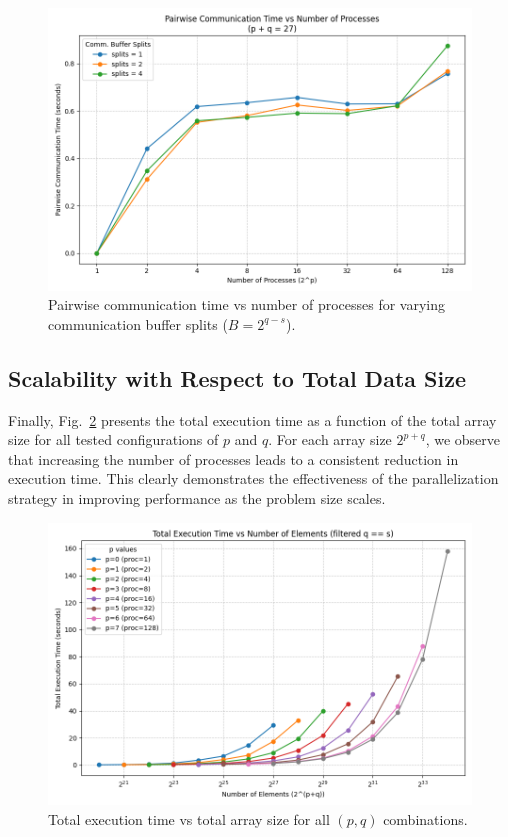 \documentclass{article}
\begin{document}
\begin{figure}
    \centering
    \includegraphics[width=1\linewidth]{figures/pairwise_comm_vs_procs_splits_sum.png}
    \caption{Pairwise communication time vs number of processes for varying communication buffer splits 
    ($B = 2^{q-s}$).}
    \label{fig:pairwise_comm_vs_procs_splits_sum}
\end{figure}

\subsection{Scalability with Respect to Total Data Size}

Finally, Fig.~\ref{fig:total_time_vs_elements} presents the total execution time as a function of the 
total array size for all tested configurations of $p$ and $q$. For each array size $2^{p+q}$, we observe
that increasing the number of processes leads to a consistent reduction in execution time. This clearly 
demonstrates the effectiveness of the parallelization strategy in improving performance as the problem 
size scales.

\begin{figure}[h]
    \centering
    \includegraphics[width=1\linewidth]{figures/total_time_vs_elements.png}
    \caption{Total execution time vs total array size for all $(p, q)$ combinations.}
    \label{fig:total_time_vs_elements}
\end{figure}
\end{document}
